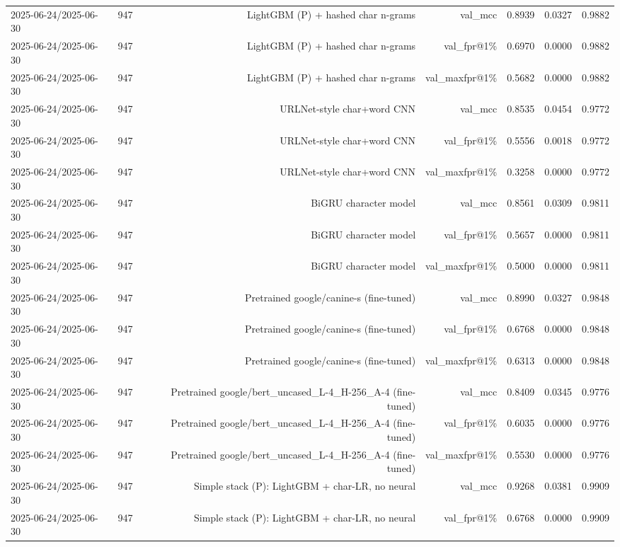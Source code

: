 \begin{table}[t]
\begin{tabular}{llrrrrr}
2025-06-24/2025-06-30 & 947 & LightGBM (P) + hashed char n-grams & val\_mcc & 0.8939 & 0.0327 & 0.9882 \\
2025-06-24/2025-06-30 & 947 & LightGBM (P) + hashed char n-grams & val\_fpr@1\% & 0.6970 & 0.0000 & 0.9882 \\
2025-06-24/2025-06-30 & 947 & LightGBM (P) + hashed char n-grams & val\_maxfpr@1\% & 0.5682 & 0.0000 & 0.9882 \\
2025-06-24/2025-06-30 & 947 & URLNet-style char+word CNN & val\_mcc & 0.8535 & 0.0454 & 0.9772 \\
2025-06-24/2025-06-30 & 947 & URLNet-style char+word CNN & val\_fpr@1\% & 0.5556 & 0.0018 & 0.9772 \\
2025-06-24/2025-06-30 & 947 & URLNet-style char+word CNN & val\_maxfpr@1\% & 0.3258 & 0.0000 & 0.9772 \\
2025-06-24/2025-06-30 & 947 & BiGRU character model & val\_mcc & 0.8561 & 0.0309 & 0.9811 \\
2025-06-24/2025-06-30 & 947 & BiGRU character model & val\_fpr@1\% & 0.5657 & 0.0000 & 0.9811 \\
2025-06-24/2025-06-30 & 947 & BiGRU character model & val\_maxfpr@1\% & 0.5000 & 0.0000 & 0.9811 \\
2025-06-24/2025-06-30 & 947 & Pretrained google/canine-s (fine-tuned) & val\_mcc & 0.8990 & 0.0327 & 0.9848 \\
2025-06-24/2025-06-30 & 947 & Pretrained google/canine-s (fine-tuned) & val\_fpr@1\% & 0.6768 & 0.0000 & 0.9848 \\
2025-06-24/2025-06-30 & 947 & Pretrained google/canine-s (fine-tuned) & val\_maxfpr@1\% & 0.6313 & 0.0000 & 0.9848 \\
2025-06-24/2025-06-30 & 947 & Pretrained google/bert\_uncased\_L-4\_H-256\_A-4 (fine-tuned) & val\_mcc & 0.8409 & 0.0345 & 0.9776 \\
2025-06-24/2025-06-30 & 947 & Pretrained google/bert\_uncased\_L-4\_H-256\_A-4 (fine-tuned) & val\_fpr@1\% & 0.6035 & 0.0000 & 0.9776 \\
2025-06-24/2025-06-30 & 947 & Pretrained google/bert\_uncased\_L-4\_H-256\_A-4 (fine-tuned) & val\_maxfpr@1\% & 0.5530 & 0.0000 & 0.9776 \\
2025-06-24/2025-06-30 & 947 & Simple stack (P): LightGBM + char-LR, no neural & val\_mcc & 0.9268 & 0.0381 & 0.9909 \\
2025-06-24/2025-06-30 & 947 & Simple stack (P): LightGBM + char-LR, no neural & val\_fpr@1\% & 0.6768 & 0.0000 & 0.9909 \\

\end{tabular}
\end{table}
